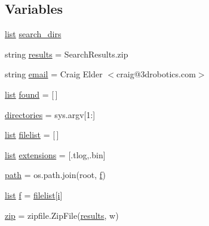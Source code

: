 \subsection*{Variables}
\begin{DoxyCompactItemize}
\item 
\mbox{\hyperlink{structlist}{list}} \mbox{\hyperlink{namespacepymavlink_1_1tools_1_1MPU6KSearch_a9ed3d2455a7095caeaeb4f078ce9b64c}{search\+\_\+dirs}}
\item 
string \mbox{\hyperlink{namespacepymavlink_1_1tools_1_1MPU6KSearch_ac0205e09e9160c156c91decf18d0b6c0}{results}} = \textquotesingle{}Search\+Results.\+zip\textquotesingle{}
\item 
string \mbox{\hyperlink{namespacepymavlink_1_1tools_1_1MPU6KSearch_addf5782d97897730d0cb3b7410787906}{email}} = \textquotesingle{}Craig Elder $<$craig@3drobotics.\+com$>$\textquotesingle{}
\item 
\mbox{\hyperlink{structlist}{list}} \mbox{\hyperlink{namespacepymavlink_1_1tools_1_1MPU6KSearch_ac237d9dc19ad865c06c3b254b1413ea0}{found}} = \mbox{[}$\,$\mbox{]}
\item 
\mbox{\hyperlink{namespacepymavlink_1_1tools_1_1MPU6KSearch_a91724bc509807606cd6a2e1598b58891}{directories}} = sys.\+argv\mbox{[}1\+:\mbox{]}
\item 
\mbox{\hyperlink{structlist}{list}} \mbox{\hyperlink{namespacepymavlink_1_1tools_1_1MPU6KSearch_aca86a704134fd3da4bb5925d74832d36}{filelist}} = \mbox{[}$\,$\mbox{]}
\item 
\mbox{\hyperlink{structlist}{list}} \mbox{\hyperlink{namespacepymavlink_1_1tools_1_1MPU6KSearch_ab42858fbaf5e3782f567e13183d9ea07}{extensions}} = \mbox{[}\textquotesingle{}.tlog\textquotesingle{},\textquotesingle{}.bin\textquotesingle{}\mbox{]}
\item 
\mbox{\hyperlink{namespacepymavlink_1_1tools_1_1MPU6KSearch_a159243f0ffefc2196fac676fca1d67c1}{path}} = os.\+path.\+join(root, \mbox{\hyperlink{namespacepymavlink_1_1tools_1_1MPU6KSearch_ac07a87a94d378396fc6958ca6fcb3064}{f}})
\item 
\mbox{\hyperlink{structlist}{list}} \mbox{\hyperlink{namespacepymavlink_1_1tools_1_1MPU6KSearch_ac07a87a94d378396fc6958ca6fcb3064}{f}} = \mbox{\hyperlink{namespacepymavlink_1_1tools_1_1MPU6KSearch_aca86a704134fd3da4bb5925d74832d36}{filelist}}\mbox{[}\mbox{\hyperlink{velTest_8cpp_a1239420b8759f52cbab64225b82461e2}{i}}\mbox{]}
\item 
\mbox{\hyperlink{namespacepymavlink_1_1tools_1_1MPU6KSearch_a20389f5c308cc78d8368d19db6ef8b92}{zip}} = zipfile.\+Zip\+File(\mbox{\hyperlink{namespacepymavlink_1_1tools_1_1MPU6KSearch_ac0205e09e9160c156c91decf18d0b6c0}{results}}, \textquotesingle{}w\textquotesingle{})

\end{DoxyCompactItemize}
